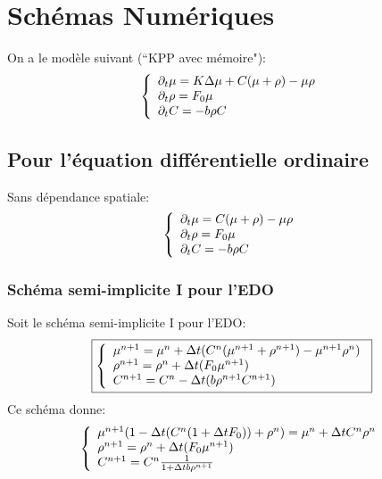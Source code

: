 \documentclass[11pt]{article}
\begin{document}
\fi

\section{Schémas Numériques}
On a le modèle suivant (``KPP avec mémoire"): 
\begin{equation} \left\{
                \begin{array}{ll}
                   \partial_t\mu = K\Delta\mu + C(\mu + \rho) -\mu\rho\\
                 \partial_t\rho=  F_0 \mu \\
                  \partial_t C = -b\rho C
                \end{array}
              \right.
\end{equation}
\subsection{Pour l'équation différentielle ordinaire}
Sans dépendance spatiale:
\begin{equation} \left\{
                \begin{array}{ll}
                   \partial_t\mu = C(\mu + \rho) -\mu\rho\\
                 \partial_t\rho=  F_0 \mu \\
                  \partial_t C = -b\rho C
                \end{array}
              \right.
\end{equation} 
\subsubsection{Schéma semi-implicite I pour l'EDO}
Soit le schéma semi-implicite I pour l'EDO:
\begin{equation} \boxed{\left\{
                \begin{array}{ll}
                   \mu^{n+1} = \mu^{n}+  \Delta t( C^{n}(\mu^{n+1} + \rho^{n+1}) -\mu^{n+1}\rho^{n})\\
                \rho^{n+1}=  \rho^{n}+ \Delta t (F_0 \mu^{n+1}) \\
                 C^{n+1} =C^{n}- \Delta t(b\rho^{n+1}C^{n+1})
                \end{array}
              \right.}
\end{equation}
Ce schéma donne:
\begin{equation*} \left\{
                \begin{array}{ll}
                   \mu^{n+1}(1-\Delta t(C^{n}(1+\Delta t F_0)) + \rho^{n}) = \mu^{n}+  \Delta t C^{n}\rho^{n} \\
                \rho^{n+1}=  \rho^{n}+ \Delta t (F_0 \mu^{n+1}) \\
                 C^{n+1} =C^{n}\frac{1}{1+ \Delta t b\rho^{n+1}}
                \end{array}
              \right.
\end{equation*}
\end{document}
